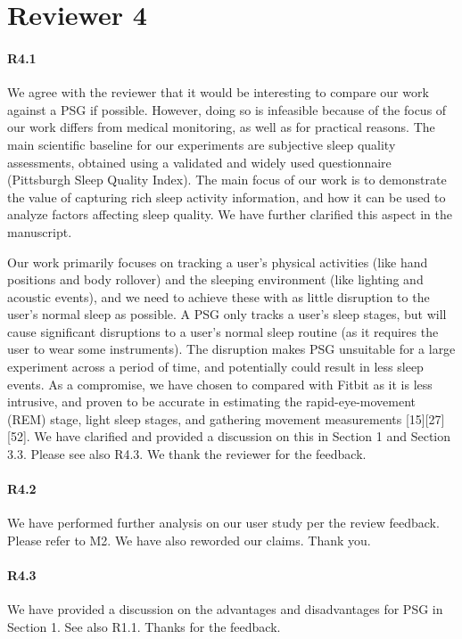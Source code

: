 \section*{Reviewer 4}

\paragraph{R4.1} We agree with the reviewer that it would be interesting to compare our work against a PSG if possible. However, doing so
is infeasible because of the focus of our work differs from medical monitoring, as well as for practical reasons. The main scientific baseline for our experiments are subjective sleep quality assessments, obtained using a validated and widely used questionnaire (Pittsburgh Sleep Quality Index). The main focus of our work is to demonstrate the value of capturing rich sleep activity information, and how it can be used to analyze factors affecting sleep quality. We have further clarified this aspect in the manuscript. 

 Our work primarily focuses on tracking a user's physical activities
(like hand positions and body rollover) and the sleeping environment (like lighting and acoustic events), and we need to achieve these with
as little disruption to the user's normal sleep as possible. A PSG only tracks a user's sleep stages, but will cause significant
disruptions to a user's normal sleep routine (as it requires the user to wear some instruments). The disruption makes PSG unsuitable for a
large experiment across a period of time, and potentially could result in less sleep events. As a compromise, we have chosen to compared with Fitbit as it is less intrusive, and proven to be
accurate in estimating the rapid-eye-movement (REM) stage, light sleep stages, and gathering movement
measurements [15][27][52]. We have clarified and provided a discussion on this in Section 1 and Section 3.3. Please see also R4.3. We
thank the reviewer for the feedback.

\paragraph{R4.2} We have performed further analysis on our user study per the review feedback. Please refer to M2. We have also reworded our
claims. Thank you. \vspace{-2mm}

\paragraph{R4.3} We have provided a discussion on the advantages and disadvantages for PSG in Section 1. See also R1.1. Thanks for the feedback.
\vspace{-2mm}
